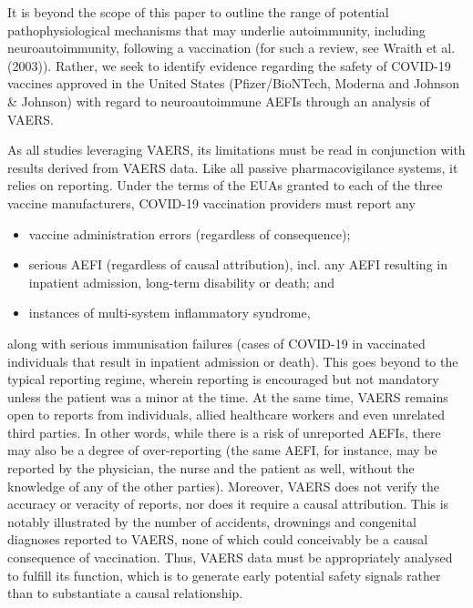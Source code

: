 \documentclass[idr,communication,submit,oneauthor,pdftex]{Definitions/mdpi}
\begin{document}
It is beyond the scope of this paper to outline the range of potential pathophysiological mechanisms that may underlie
autoimmunity, including neuroautoimmunity, following a vaccination (for such a review, see Wraith et al.
(2003)\cite{wraith2003vaccination}). Rather, we seek to identify evidence regarding the safety of COVID-19 vaccines
approved in the United States (Pfizer/BioNTech, Moderna and Johnson \& Johnson) with regard to neuroautoimmune AEFIs
through an analysis of VAERS.

As all studies leveraging VAERS, its limitations must be read in conjunction with results derived from VAERS data. Like
all passive pharmacovigilance systems, it relies on reporting. Under the terms of the EUAs granted to each of the three
vaccine manufacturers, COVID-19 vaccination providers must report any

\begin{itemize}
\item	vaccine administration errors (regardless of consequence);
\item	serious AEFI (regardless of causal attribution), incl. any AEFI resulting in inpatient admission, long-term
disability or death; and
\item	instances of multi-system inflammatory syndrome,
\end{itemize}

\noindent along with serious immunisation failures (cases of COVID-19 in vaccinated individuals that result in
inpatient admission or death). This goes beyond to the typical reporting regime, wherein reporting is encouraged but
not mandatory unless the patient was a minor at the time. At the same time, VAERS remains open to reports from
individuals, allied healthcare workers and even unrelated third
parties.\cite{chen1994vaccine,shimabukuro2015safety,singleton1999overview} In other words, while there is a risk of
unreported AEFIs, there may also be a degree of over-reporting (the same AEFI, for instance, may be reported by the
physician, the nurse and the patient as well, without the knowledge of any of the other parties). Moreover, VAERS does
not verify the accuracy or veracity of reports, nor does it require a causal attribution. This is notably illustrated
by the number of accidents, drownings and congenital diagnoses reported to VAERS, none of which could conceivably be a
causal consequence of vaccination. Thus, VAERS data must be appropriately analysed to fulfill its function, which is to
generate early potential safety signals rather than to substantiate a causal relationship.
\end{document}
